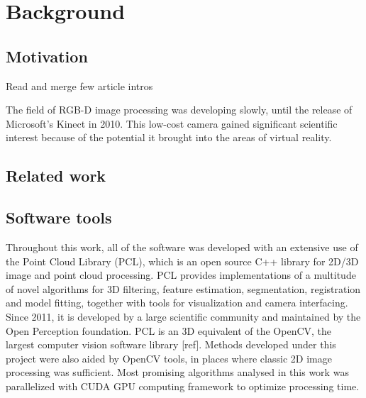 \chapter{Background}
\label{cha:background}




\section{Motivation}
\label{sec:motivation}

Read and merge few article intros


The field of RGB-D image processing was developing slowly, until the release of Microsoft's Kinect in 2010. This low-cost camera gained significant scientific interest because of the potential it brought into the areas of virtual reality.




\section{Related work}
\label{sec:related}



\section{Software tools}
\label{sec:software}

Throughout this work, all of the software was developed with an extensive use of the Point Cloud Library (PCL)\cite{Rusu_ICRA2011_PCL}, which is an open source C++ library for 2D/3D image and point cloud processing. PCL provides implementations of  a multitude of novel algorithms for 3D filtering, feature estimation, segmentation, registration and model fitting, together with tools for visualization and camera interfacing. Since 2011, it is developed by a large scientific community and maintained by the Open Perception foundation. PCL is an 3D equivalent of the OpenCV, the largest computer vision software library [ref]. Methods developed under this project were also aided by OpenCV tools, in places where classic 2D image processing was sufficient.
Most promising algorithms analysed in this work was parallelized with CUDA GPU  computing framework to optimize processing time.





